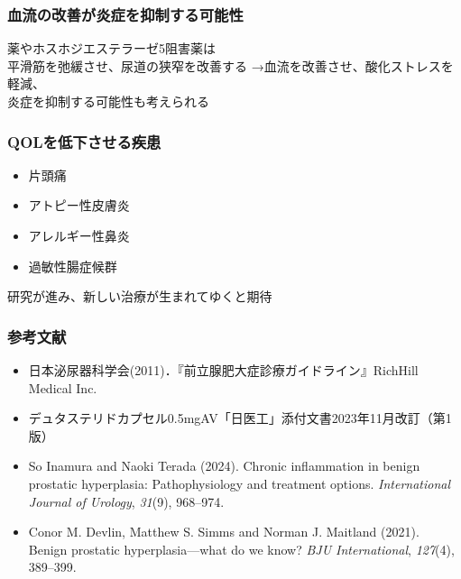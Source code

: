 \documentclass[unicode, 12pt]{beamer}
\begin{document}
\begin{frame}
  \frametitle{血流の改善が炎症を抑制する可能性}
  薬やホスホジエステラーゼ5阻害薬は\\
  平滑筋を弛緩させ、尿道の狭窄を改善する
  \vfill
  →血流を改善させ、酸化ストレスを軽減、\\
  炎症を抑制する可能性も考えられる
\end{frame}
\begin{frame}
  \frametitle{QOLを低下させる疾患}
  \begin{itemize}
    \item 片頭痛
    \item アトピー性皮膚炎
    \item アレルギー性鼻炎
    \item 過敏性腸症候群
  \end{itemize}
  \vfill
  研究が進み、新しい治療が生まれてゆくと期待
\end{frame}
\begin{frame}
  \frametitle{参考文献}
  \begin{itemize}
    \item 日本泌尿器科学会(2011)．『前立腺肥大症診療ガイドライン』RichHill Medical Inc.
    \item デュタステリドカプセル0.5mgAV「日医工」添付文書2023年11月改訂（第1版）
    \item So Inamura and Naoki Terada (2024).
      Chronic inflammation in benign prostatic hyperplasia: Pathophysiology and treatment options.
      \textit{International Journal of Urology}, \textit{31}(9), 968--974.
    \item Conor M. Devlin, Matthew S. Simms and Norman J. Maitland (2021).
      Benign prostatic hyperplasia---what do we know?
      \textit{BJU International}, \textit{127}(4), 389--399.
  \end{itemize}
\end{frame}
\end{document}
